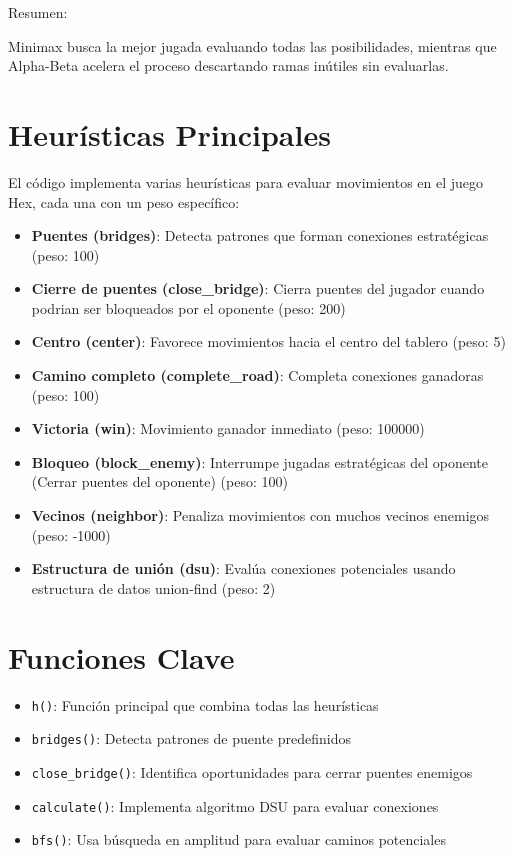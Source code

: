 \documentclass[11pt]{article}
\begin{document}
    Resumen:

    Minimax busca la mejor jugada evaluando todas las posibilidades, mientras que
    Alpha-Beta acelera el proceso descartando ramas inútiles sin evaluarlas.
    \section{Heurísticas Principales}
    El código implementa varias heurísticas para evaluar movimientos en el juego Hex, cada una con un peso específico:
    
    \begin{itemize}
        \item \textbf{Puentes (bridges)}: Detecta patrones que forman conexiones estratégicas (peso: 100)
        \item \textbf{Cierre de puentes (close\_bridge)}: Cierra puentes del jugador cuando podrian ser bloqueados por el oponente (peso: 200)
        \item \textbf{Centro (center)}: Favorece movimientos hacia el centro del tablero (peso: 5)
        \item \textbf{Camino completo (complete\_road)}: Completa conexiones ganadoras (peso: 100)
        \item \textbf{Victoria (win)}: Movimiento ganador inmediato (peso: 100000)
        \item \textbf{Bloqueo (block\_enemy)}: Interrumpe jugadas estratégicas del oponente (Cerrar puentes del oponente) (peso: 100)
        \item \textbf{Vecinos (neighbor)}: Penaliza movimientos con muchos vecinos enemigos (peso: -1000)
        \item \textbf{Estructura de unión (dsu)}: Evalúa conexiones potenciales usando estructura de datos union-find (peso: 2)
    \end{itemize}
    
    \section{Funciones Clave}
    \begin{itemize}
        \item \texttt{h()}: Función principal que combina todas las heurísticas
        \item \texttt{bridges()}: Detecta patrones de puente predefinidos
        \item \texttt{close\_bridge()}: Identifica oportunidades para cerrar puentes enemigos
        \item \texttt{calculate()}: Implementa algoritmo DSU para evaluar conexiones
        \item \texttt{bfs()}: Usa búsqueda en amplitud para evaluar caminos potenciales
    \end{itemize}
    
\end{document}

